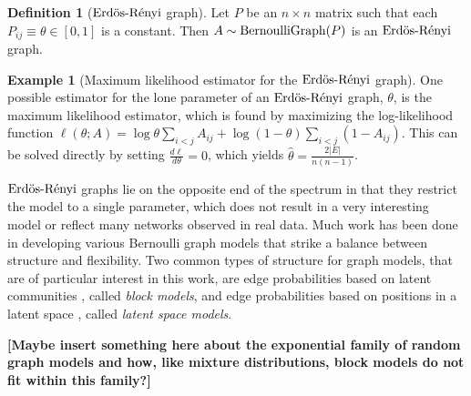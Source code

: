 \documentclass[
  11pt,
]{article}
\theoremstyle{definition}
\newtheorem{definition}{Definition}[section]
\theoremstyle{definition}
\newtheorem{example}{Example}[section]
\theoremstyle{definition}
\theoremstyle{definition}
\theoremstyle{remark}
\begin{document}
\begin{definition}[$\text{Erd\"{o}s-R\'{e}nyi}$ graph]
\label{def:erdos-renyi}
Let $P$ be an $n \times n$ matrix such that each $P_{ij} \equiv \theta \in [0, 1]$ is a constant. 
Then $A \sim \mathrm{BernoulliGraph}(P)$ is an $\text{Erd\"{o}s-R\'{e}nyi}$ graph. 
\end{definition}

\begin{example}[Maximum likelihood estimator for the $\text{Erd\"{o}s-R\'{e}nyi}$ graph]
One possible estimator for the lone parameter of an $\text{Erd\"{o}s-R\'{e}nyi}$ graph, $\theta$, is the maximum likelihood estimator, which is found by maximizing the log-likelihood function $\ell(\theta; A) = \log \theta \sum\limits_{i < j} A_{ij} + \log (1 - \theta) \sum\limits_{i < j} (1 - A_{ij})$. 
This can be solved directly by setting $\frac{d \ell}{d \theta} = 0$, which yields $\hat{\theta} = \frac{2 |E|}{n (n-1)}$.
\end{example}

\(\text{Erd\"{o}s-R\'{e}nyi}\) graphs lie on the opposite end of the spectrum in that they restrict the model to a single parameter, which does not result in a very interesting model or reflect many networks observed in real data.
Much work has been done in developing various Bernoulli graph models that strike a balance between structure and flexibility.
Two common types of structure for graph models, that are of particular interest in this work, are edge probabilities based on latent communities \citep{doi:10.1080/0022250X.1971.9989788, NIPS2008_3578, Karrer_2011, 307cbeb9b1be48299388437423d94bf1}, called \emph{block models}, and edge probabilities based on positions in a latent space \citep{10.1007/978-3-540-77004-6_11, rubindelanchy2017statistical}, called \emph{latent space models}.

\textbf{{[}Maybe insert something here about the exponential family of random graph models and how, like mixture distributions, block models do not fit within this family?{]}}
\end{document}
